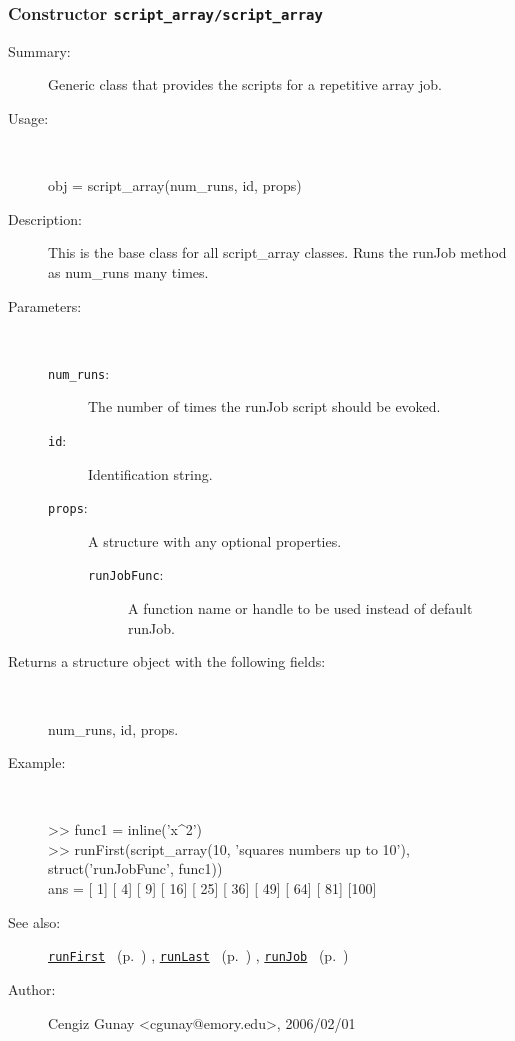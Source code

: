 \subsubsection[Constructor \texttt{script\_array}]{Constructor \texttt{script\_array/script\_array}}%
%
\label{ref_script_array__script_array}%
\hypertarget{ref_script_array__script_array}{}%
\begin{description}
\item[Summary:]Generic class that provides the scripts for a repetitive array job.
%
\item[Usage:]~%
\begin{lyxcode}%
obj = script\_array(num\_runs, id, props)
%
\end{lyxcode}%
%
\item[Description:]%
This is the base class for all script\_array classes. Runs the runJob method as 
 num\_runs many times.
\item[Parameters:]~
\begin{description}%
\item[\texttt{num\_runs}:]
 The number of times the runJob script should be evoked.
\item[\texttt{id}:]
 Identification string.
\item[\texttt{props}:]
 A structure with any optional properties.
\begin{description}%
\item[\texttt{runJobFunc}:]
 A function name or handle to be used instead of default runJob.
\end{description}%
\end{description}%
%
\item[Returns a structure object with the following fields:]~

	num\_runs, id, props.
%
\item[Example:]~
\begin{lyxcode} >> func1 = inline('x\textasciicircum{}2')\\%
 >> runFirst(script\_array(10, 'squares numbers up to 10'), struct('runJobFunc', func1))\\%
 ans = [  1]    [  4]    [  9]    [ 16]    [ 25]    [ 36]    [ 49]    [ 64]    [ 81]    [100]\\%
\end{lyxcode}
%
\item[See also:]%
\hyperlink{ref_runFirst}{\texttt{runFirst}}%
\ (p.~\pageref{ref_runFirst})%
%
, \hyperlink{ref_runLast}{\texttt{runLast}}%
\ (p.~\pageref{ref_runLast})%
%
, \hyperlink{ref_runJob}{\texttt{runJob}}%
\ (p.~\pageref{ref_runJob})%
%
%
\item[Author:]%
Cengiz Gunay <cgunay@emory.edu>, 2006/02/01%
\end{description}
\methodline%
